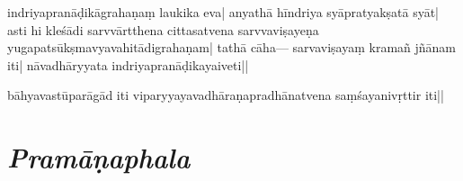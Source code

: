 indriyapranāḍikāgrahaṇaṃ laukika 
eva| anyathā hī\-ndriya 
%
%
syāpratyakṣatā syāt| 
asti hi kleśādi 
sarvvārtthena cittasatvena sarvvaviṣayeṇa %
yugapatsūkṣma\-vyavahi\-tā\-di\-grahaṇam| tathā cāha--- sarvaviṣayaṃ kramañ   jñānam iti|  nāvadhāryyata indriyapranāḍikayai\-veti||

bāhyavastūparāgād iti viparyyayavadhāraṇapradhāna\-tvena saṃśayanivṛttir iti||

\section{\emph{Pramāṇaphala}}
